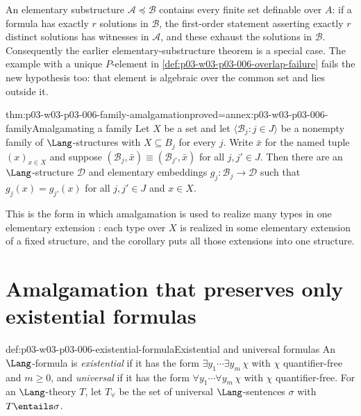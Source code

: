 An elementary substructure \(\mathcal A\preccurlyeq\mathcal B\)
contains every finite set definable over \(A\): if a formula has exactly
\(r\) solutions in \(\mathcal B\), the first-order statement asserting
exactly \(r\) distinct solutions has witnesses in \(\mathcal A\), and
these exhaust the solutions in \(\mathcal B\). Consequently the earlier
elementary-substructure theorem is a special case. The example with a
unique \(P\)-element in
\cref{def:p03-w03-p03-006-overlap-failure} fails the new hypothesis too:
that element is algebraic over the common set and lies outside it.


\begin{hbcorollary}{thm:p03-w03-p03-006-family-amalgamation}{proved=annex:p03-w03-p03-006-family}{Amalgamating a family}
Let \(X\) be a set and let \(\langle\mathcal B_j:j\in J\rangle\) be a
nonempty family of \(\Lang\)-structures with \(X\subseteq B_j\) for every
\(j\).  Write \(\bar x\) for the named tuple \((x)_{x\in X}\) and suppose
\((\mathcal B_j,\bar x)\equiv(\mathcal B_{j'},\bar x)\) for all
\(j,j'\in J\).  Then there are an \(\Lang\)-structure \(\mathcal D\) and
elementary embeddings \(g_j:\mathcal B_j\to\mathcal D\) such that
\(g_j(x)=g_{j'}(x)\) for all \(j,j'\in J\) and \(x\in X\).
\end{hbcorollary}

This is the form in which amalgamation is used to realize many types in one
elementary extension \cite[Lecture~19, Corollaries, pp.~5--6]{Speirs2013Amalgamation}:
each type over \(X\) is realized in some elementary extension of a fixed
structure, and the corollary puts all those extensions into one structure.

\section{Amalgamation that preserves only existential formulas}
\label{sec:p03-w03-p03-006-existential}

\begin{hbdefinition}{def:p03-w03-p03-006-existential-formula}{Existential and universal formulas}
An \(\Lang\)-formula is \emph{existential} if it has the form
\(\exists y_1\cdots\exists y_m\,\chi\) with \(\chi\) quantifier-free and
\(m\ge 0\), and \emph{universal} if it has the form
\(\forall y_1\cdots\forall y_m\,\chi\) with \(\chi\) quantifier-free.  For
an \(\Lang\)-theory \(T\), let \(T_\forall\) be the set of universal
\(\Lang\)-sentences \(\sigma\) with \(T\entails\sigma\).
\end{hbdefinition}


